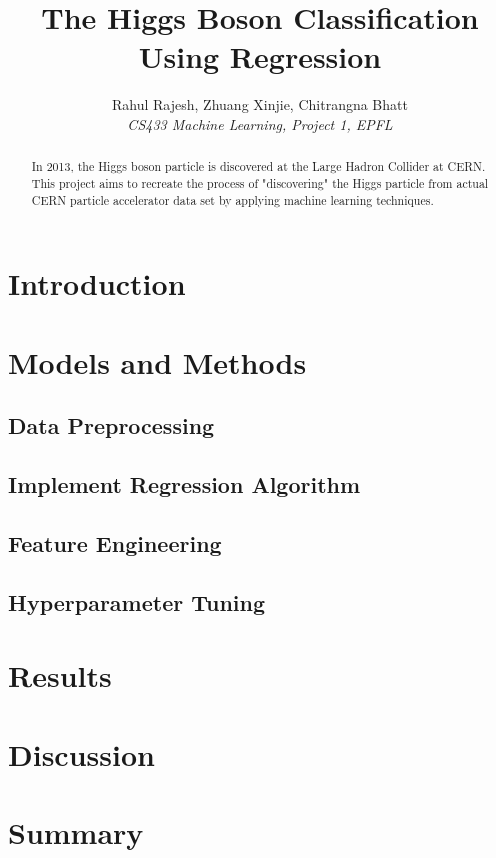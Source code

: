 \documentclass[10pt, conference, compsocconf]{IEEEtran}
\begin{document}
\title{The Higgs Boson Classification Using Regression}

\author{
    Rahul Rajesh, Zhuang Xinjie, Chitrangna Bhatt\\
    \textit{CS433 Machine Learning, Project 1, EPFL}
}

\maketitle

\begin{abstract}
    In 2013, the Higgs boson particle is discovered at the Large Hadron Collider at CERN.
    This project aims to recreate the process of "discovering" the Higgs particle from actual
    CERN particle accelerator data set by applying machine learning techniques.
\end{abstract}


\section{Introduction}

\section{Models and Methods}

\subsection{Data Preprocessing}

\subsection{Implement Regression Algorithm}

\subsection{Feature Engineering}

\subsection{Hyperparameter Tuning}


\section{Results}

\section{Discussion}

\section{Summary}
\end{document}
